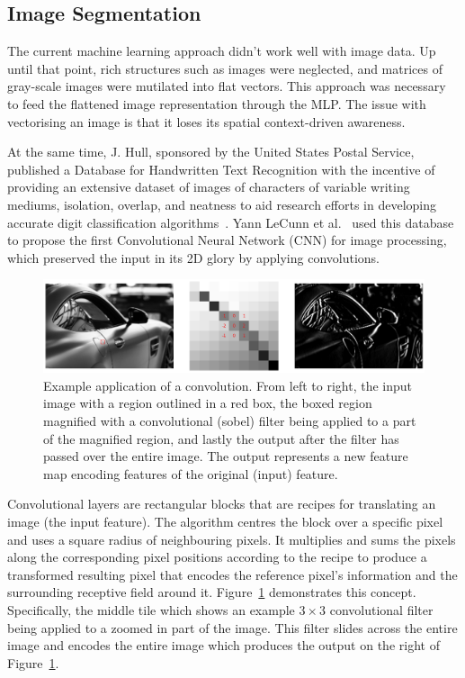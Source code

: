 \documentclass[12pt,twoside]{report}
\begin{document}
\subsection{Image Segmentation}\label{sect:image-segmentation}

The current machine learning approach didn't work well with image data. Up until that point, rich structures such as images were neglected, and matrices of gray-scale images were mutilated into flat vectors. This approach was necessary to feed the flattened image representation through the MLP. The issue with vectorising an image is that it loses its spatial context-driven awareness. 

At the same time, J. Hull, sponsored by the United States Postal Service, published a Database for Handwritten Text Recognition with the incentive of providing an extensive dataset of images of characters of variable writing mediums, isolation, overlap, and neatness to aid research efforts in developing accurate digit classification algorithms~\cite{JJHull1994}. Yann LeCunn et al.~\cite{Lenet1998} used this database to propose the first Convolutional Neural Network (CNN) for image processing, which preserved the input in its 2D glory by applying convolutions.

\begin{figure}[H]
  \centering
  \includegraphics[width=1\linewidth]{../figures/sobel.png}
  \caption{Example application of a convolution. From left to right, the input image with a region outlined in a red box, the boxed region magnified with a convolutional (sobel) filter being applied to a part of the magnified region, and lastly the output after the filter has passed over the entire image. The output represents a new feature map encoding features of the original (input) feature.}\label{fig:sobel}
\end{figure}

Convolutional layers are rectangular blocks that are recipes for translating an image (the input feature). The algorithm centres the block over a specific pixel and uses a square radius of neighbouring pixels. It multiplies and sums the pixels along the corresponding pixel positions according to the recipe to produce a transformed resulting pixel that encodes the reference pixel's information and the surrounding receptive field around it. Figure~\ref{fig:sobel} demonstrates this concept. Specifically, the middle tile which shows an example $3 \times 3$ convolutional filter being applied to a zoomed in part of the image. This filter slides across the entire image and encodes the entire image which produces the output on the right of Figure~\ref{fig:sobel}. 
\end{document}
